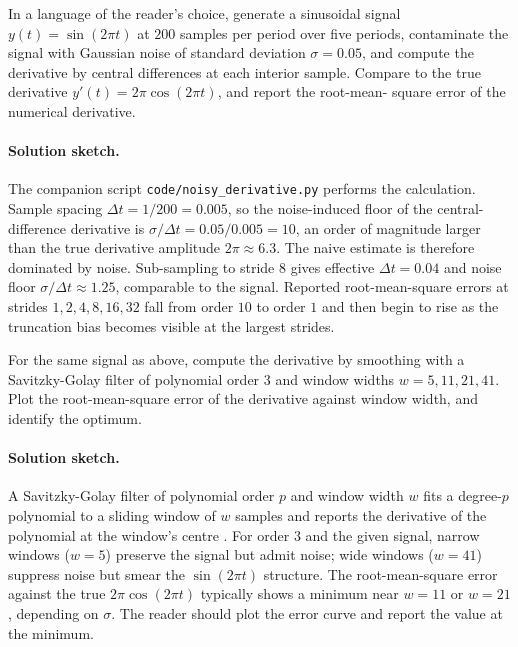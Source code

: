 \begin{exercise}
In a language of the reader's choice, generate a sinusoidal signal
$y(t) = \sin(2\pi t)$ at $200$ samples per period over five
periods, contaminate the signal with Gaussian noise of standard
deviation $\sigma = 0.05$, and compute the derivative by central
differences at each interior sample. Compare to the true
derivative $y'(t) = 2\pi \cos(2\pi t)$, and report the root-mean-
square error of the numerical derivative.
\end{exercise}

\paragraph{Solution sketch.}
The companion script \texttt{code/noisy\_derivative.py} performs
the calculation. Sample spacing $\Delta t = 1/200 = 0.005$, so
the noise-induced floor of the central-difference derivative is
$\sigma / \Delta t = 0.05 / 0.005 = 10$, an order of magnitude
larger than the true derivative amplitude $2\pi \approx 6.3$. The
naive estimate is therefore dominated by noise. Sub-sampling to
stride $8$ gives effective $\Delta t = 0.04$ and noise floor
$\sigma / \Delta t \approx 1.25$, comparable to the signal.
Reported root-mean-square errors at strides $1, 2, 4, 8, 16, 32$
fall from order $10$ to order $1$ and then begin to rise as the
truncation bias becomes visible at the largest strides.

\begin{exercise}
For the same signal as above, compute the derivative by smoothing
with a Savitzky-Golay filter of polynomial order $3$ and window
widths $w = 5, 11, 21, 41$. Plot the root-mean-square error of the
derivative against window width, and identify the optimum.
\end{exercise}

\paragraph{Solution sketch.}
A Savitzky-Golay filter of polynomial order $p$ and window width
$w$ fits a degree-$p$ polynomial to a sliding window of $w$ samples
and reports the derivative of the polynomial at the window's
centre \cite{text:v2ch05-savitzky-golay-1964}. For order $3$ and
the given signal, narrow windows ($w = 5$) preserve the signal but
admit noise; wide windows ($w = 41$) suppress noise but smear the
$\sin(2\pi t)$ structure. The root-mean-square error against the
true $2\pi \cos(2\pi t)$ typically shows a minimum near $w = 11$
or $w = 21$, depending on $\sigma$. The reader should plot the
error curve and report the value at the minimum.


